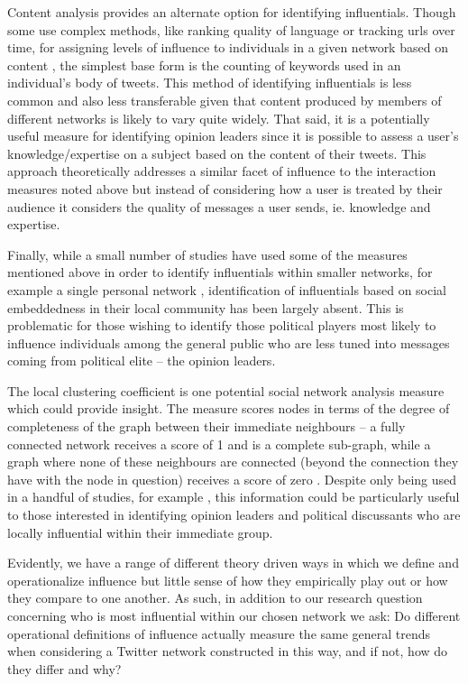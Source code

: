 \documentclass[a4paper,12pt]{article}
\begin{document}
Content analysis provides an alternate option for identifying influentials. Though some use complex methods, like ranking quality of language or tracking urls over time, for assigning levels of influence to individuals in a given network based on content \cite{Bakshy, sharawneh2013, Ye2010}, the simplest base form is the counting of keywords used in an individual's body of tweets. This method of identifying influentials is less common and also less transferable given that content produced by members of different networks is likely to vary quite widely. That said, it is a potentially useful measure for identifying opinion leaders since it is possible to assess a user's knowledge/expertise on a subject based on the content of their tweets. This approach theoretically addresses a similar facet of influence to the interaction measures noted above but instead of considering how a user is treated by their audience it considers the quality of messages a user sends, ie. knowledge and expertise.

Finally, while a small number of studies have used some of the measures mentioned above in order to identify influentials within smaller networks, for example a single personal network \cite{gruzdwellmantakhteyev}, identification of influentials based on social embeddedness in their local community has been largely absent. This is problematic for those wishing to identify those political players most likely to influence individuals among the general public who are less tuned into messages coming from political elite -- the opinion leaders.

The local clustering coefficient is one potential social network analysis measure which could provide insight. The measure scores nodes in terms of the degree of completeness of the graph between their immediate neighbours -- a fully connected network receives a score of 1 and is a complete sub-graph, while a graph where none of these neighbours are connected (beyond the connection they have with the node in question) receives a score of zero \cite{WattsStrogatz1998}. Despite only being used in a handful of studies, for example \cite{Bigonha2011, Sousa, Hill}, this information could be particularly useful to those interested in identifying opinion leaders and political discussants who are locally influential within their immediate group.

Evidently, we have a range of different theory driven ways in which we define and operationalize influence but little sense of how they empirically play out or how they compare to one another. As such, in addition to our research question concerning who is most influential within our chosen network we ask: Do different operational definitions of influence actually measure the same general trends when considering a Twitter network constructed in this way, and if not, how do they differ and why? 
\end{document}
